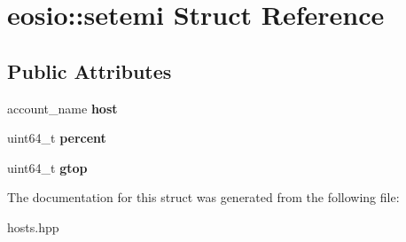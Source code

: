 \hypertarget{structeosio_1_1setemi}{}\section{eosio\+:\+:setemi Struct Reference}
\label{structeosio_1_1setemi}
\subsection*{Public Attributes}
\begin{DoxyCompactItemize}
\item 
\mbox{\label{structeosio_1_1setemi_a2cadbe9c99c49eebbc5a8e9c2026c977}} 
account\+\_\+name {\bfseries host}
\item 
\mbox{\label{structeosio_1_1setemi_a3c9bcbf67c01d2a23f40fdb1504ac020}} 
uint64\+\_\+t {\bfseries percent}
\item 
\mbox{\label{structeosio_1_1setemi_a9d4a8252c7d1b49a671158db9f36b275}} 
uint64\+\_\+t {\bfseries gtop}
\end{DoxyCompactItemize}


The documentation for this struct was generated from the following file\+:\begin{DoxyCompactItemize}
\item 
hosts.\+hpp\end{DoxyCompactItemize}
